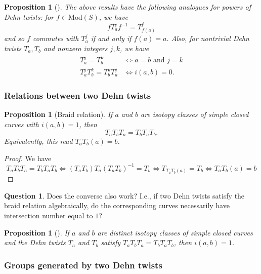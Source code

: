 \documentclass[reqno]{amsart}
\newtheorem{proposition}[theorem]{Proposition}
\theoremstyle{definition}
\newtheorem{question}[theorem]{Question}
\theoremstyle{remark}
\newcommand{\Mod}{{\mathrm{Mod}}}
\begin{document}
\begin{proposition}[]
    The above results have the following analogues for
    powers of Dehn twists:
    for $f \in \Mod(S)$, we have
    \[
    f T_a^{j} f^{-1} = T_{f(a)}^{j}
    \] 
    and so $f$ commutes with $T_a^{j}$ if and only if
    $f(a) = a$. Also, for nontrivial Dehn
    twists $T_a, T_b$ and nonzero integers $j,k$, we have
    \begin{align*}
        T_a^{j} = T_b^{k} &\iff a=b \text{ and } j=k\\
        T_a^{j} T_b^{k} = T_b^{k} T_a^{j} &\iff i(a,b) =0.
    \end{align*}
\end{proposition}


\subsubsection{Relations between two Dehn twists}

\begin{proposition}[Braid relation]\label{dehn-braid-relation}
    If $a$ and $b$ are isotopy classes of simple closed
    curves with $i(a,b) = 1$, then
    \[
    T_a T_b T_a = T_b T_a T_b.
    \] 
    Equivalently, this read
    $T_a T_b(a) = b$.
\end{proposition}

\begin{proof}
    We have
    \[
    T_a T_b T_a = T_b T_a T_b \iff
    \left( T_a T_b \right) T_a \left( T_a T_b \right)^{-1}
    = T_b
    \iff
    T_{T_a T_b (a)} = T_b
    \iff
    T_a T_b (a) = b
    \] 
    
\end{proof}

\begin{question}
    Does the converse also work? I.e., if two Dehn twists
    satisfy the braid relation algebraically, do the
    corresponding curves necessarily have intersection
    number equal to $1$?
\end{question}

\begin{proposition}[]
    If $a$ and $b$ are distinct isotopy classes of simple closed
    curves and the Dehn twists $T_a$ and $T_b$ satisfy
    $T_a T_b T_a = T_b T_a T_b$, then
    $i(a,b) = 1$.
\end{proposition}

\subsubsection*{Groups generated by two Dehn twists}
\end{document}

